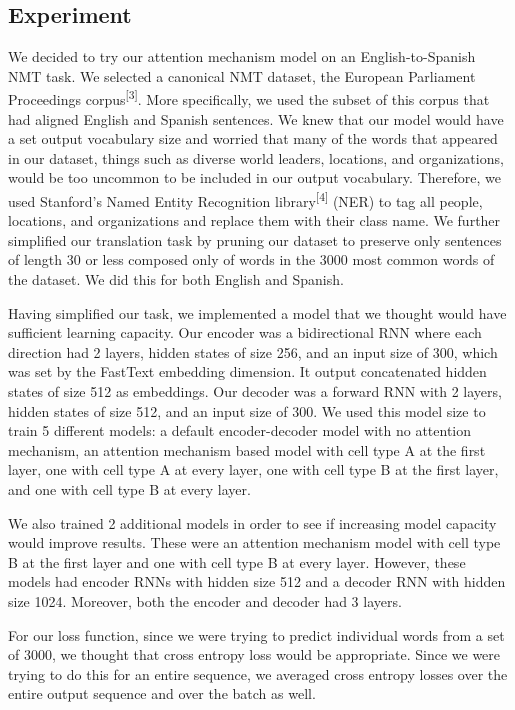 \documentclass[letterpaper, 10pt]{article}
\begin{document}
\begin{multicols}{2}
\section{Experiment}

We decided to try our attention mechanism model on an English-to-Spanish NMT task.
We selected a canonical NMT dataset, the European Parliament Proceedings corpus\textsuperscript{[3]}.
More specifically, we used the subset of this corpus that had aligned English and Spanish sentences.
We knew that our model would have a set output vocabulary size and worried that many of the words
that appeared in our dataset, things such as diverse world leaders, locations, and organizations,
would be too uncommon to be included in our output vocabulary.
Therefore, we used Stanford’s Named Entity Recognition library\textsuperscript{[4]} (NER)
to tag all people, locations, and organizations and replace them with their class name.
We further simplified our translation task by pruning our dataset to preserve only sentences of
length 30 or less composed only of words in the 3000 most common words of the dataset.
We did this for both English and Spanish.

Having simplified our task, we implemented a model that we thought would have sufficient learning
capacity.
Our encoder was a bidirectional RNN where each direction had 2 layers, hidden states of size 256,
and an input size of 300, which was set by the FastText embedding dimension.
It output concatenated hidden states of size 512 as embeddings.
Our decoder was a forward RNN with 2 layers, hidden states of size 512, and an input size of 300.
We used this model size to train 5 different models: a default encoder-decoder model with no
attention mechanism, an attention mechanism based model with cell type A at the first
layer, one with cell type A at every layer, one with cell type B at the first
layer, and one with cell type B at every layer.

We also trained 2 additional models in order to see if increasing model capacity would improve
results.
These were an attention mechanism model with cell type B at the first layer and one with
cell type B at every layer.
However, these models had encoder RNNs with hidden size 512 and a decoder RNN with hidden size
1024.
Moreover, both the encoder and decoder had 3 layers.

For our loss function, since we were trying to predict individual words from a set of 3000, we
thought that cross entropy loss would be appropriate. Since we were trying to do this for an entire
sequence, we averaged cross entropy losses over the entire output sequence and over the batch as
well.


\end{multicols}
\end{document}
